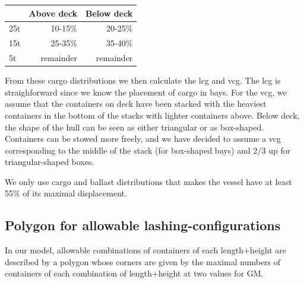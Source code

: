 \begin{center}
\begin{tabular}{l|rr}
		&	Above deck &	Below deck\\ 
		\hline
25t	&		10-15\%	 &	20-25\%	\\	
15t	&		25-35\%	 &	35-40\% \\
5t	&	remainder  &	remainder\\
\end{tabular}
\end{center}

From these cargo distributions we then calculate the lcg and vcg. The lcg is straighforward since we know the placement of cargo in bays. For the vcg, we assume that the containers on deck have been stacked with the heaviest containers in the bottom of the stacks with lighter containers above. Below deck, the shape of the hull can be seen as either triangular or as box-shaped. Containers can be stowed more freely, and we have decided to assume a vcg corresponding to the middle of the stack (for box-shaped bays) and 2/3 up for triangular-shaped boxes. %

We only use cargo and ballast distributions that makes the vessel have at least 55\% of its maximal displacement. 


\subsection{Polygon for allowable lashing-configurations} 
In our model, allowable combinations of containers of each length+height are described by a polygon whose corners are given by the maximal numbers of containers of each combination of length+height at two values for GM.  

